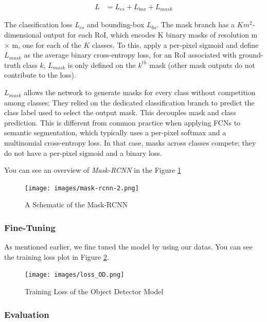\documentclass[a4paper, openany]{book}
\begin{document}
\begin{eqnarray*}
L &= L_{cs} +L_{box}+L_{mask}
\end{eqnarray*}

The classification loss $L_{cs}$ and bounding-box $L_{bo}$. The mask branch has a $Km^2$-dimensional output for each RoI, which encodes K binary masks of resolution m × m, one for each of the $K$ classes. To this, apply a per-pixel sigmoid and define $L_{mask}$ as the average binary cross-entropy loss, for an RoI associated with ground-truth class $k$, $L_{mask}$ is only defined on the $k^{th}$ mask (other mask outputs do not contribute to the loss).

$L_{mask}$ allows the network to generate masks for every class without competition among classes; They relied on the dedicated classification branch to predict the class label used to select the output mask. This decouples mask and class prediction. This is different from common practice when applying FCNs to semantic segmentation, which typically uses a per-pixel softmax and a multinomial cross-entropy loss. In that case, masks across classes compete; they do not have a per-pixel sigmoid and a binary loss.

You can see an overview of \textit{Mask-RCNN} in the Figure \ref{fig:mask-rcnn-2}

\begin{figure}[ht]
  \centering
    \texttt{[image: images/mask-rcnn-2.png]}
      \caption{A Schematic of the Mask-RCNN}
  \label{fig:mask-rcnn-2}
\end{figure}

\newpage
\subsubsection{Fine-Tuning}
	\vspace{0.3cm}

As mentioned earlier, we fine tuned the model by using our datas. You can see the training loss plot in Figure \ref{fig:loss_OD}.

\begin{figure}[ht]
  \centering
    \texttt{[image: images/loss\_OD.png]}
      \caption{Training Loss of the Object Detector Model}
  \label{fig:loss_OD}
\end{figure}


\subsubsection{Evaluation}
	\vspace{0.3cm}
\end{document}
